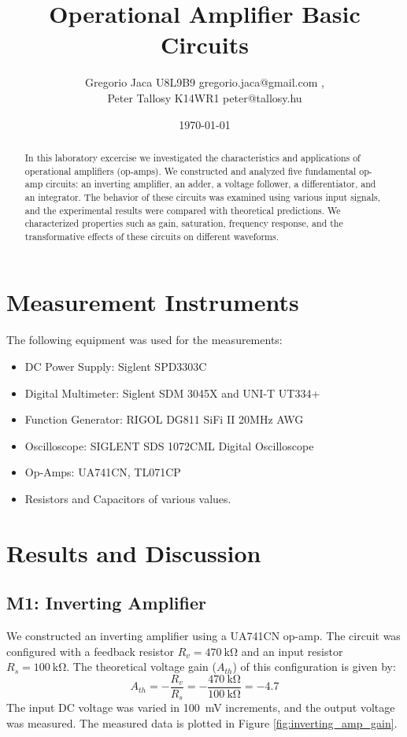\documentclass[12pt,a4paper]{article}
\title{Operational Amplifier Basic Circuits}
\author{Gregorio Jaca U8L9B9 gregorio.jaca@gmail.com , \\ Peter Tallosy K14WR1 peter@tallosy.hu }
\date{\today}
\begin{document}
\maketitle

\begin{abstract}
In this laboratory excercise we investigated the characteristics and applications of operational amplifiers (op-amps). We constructed and analyzed five fundamental op-amp circuits: an inverting amplifier, an adder, a voltage follower, a differentiator, and an integrator. The behavior of these circuits was examined using various input signals, and the experimental results were compared with theoretical predictions. We characterized properties such as gain, saturation, frequency response, and the transformative effects of these circuits on different waveforms.
\end{abstract}

\section{Measurement Instruments}
The following equipment was used for the measurements:
\begin{itemize}
    \item DC Power Supply: Siglent SPD3303C
    \item Digital Multimeter: Siglent SDM 3045X and UNI-T UT334+
    \item Function Generator: RIGOL DG811 SiFi II 20MHz AWG
    \item Oscilloscope: SIGLENT SDS 1072CML Digital Oscilloscope
    \item Op-Amps: UA741CN, TL071CP
    \item Resistors and Capacitors of various values.
\end{itemize}

\section{Results and Discussion}

\subsection{M1: Inverting Amplifier}
We constructed an inverting amplifier using a UA741CN op-amp. The circuit was configured with a feedback resistor \(R_v = \SI{470}{\kilo\ohm}\) and an input resistor \(R_s = \SI{100}{\kilo\ohm}\). The theoretical voltage gain (\(A_{th}\)) of this configuration is given by:
\begin{equation}
    A_{th} = -\frac{R_v}{R_s} = -\frac{\SI{470}{\kilo\ohm}}{\SI{100}{\kilo\ohm}} = -4.7
\end{equation}
The input DC voltage was varied in \SI{100}{\milli\volt} increments, and the output voltage was measured. The measured data is plotted in Figure \ref{fig:inverting_amp_gain}.
\end{document}
